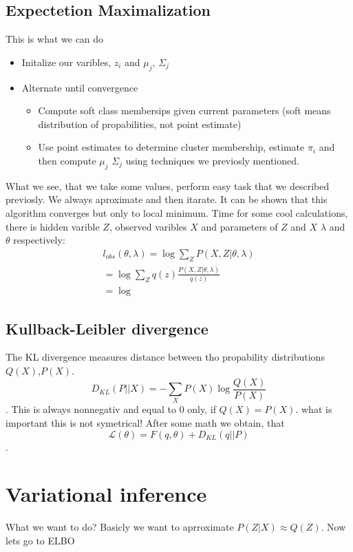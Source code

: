 \documentclass[12pt,a4paper]{article}
\begin{document}
\subsection{Expectetion Maximalization}
This is what we can do
\begin{itemize}
    \item Initalize our varibles, $z_i$ and $\mu_j$, $\Sigma_j$
    \item Alternate until convergence \begin{itemize}
        \item   Compute soft class membersips given current parameters (soft means distribution of propabilities, not point estimate)
        \item   Use point estimates to determine cluster membership, estimate $\pi_i$ and then compute $\mu_j$ $\Sigma_j$ using techniques we previosly mentioned. 
    \end{itemize}
\end{itemize}
What we see, that we take some values, perform easy task that we described previosly. We always aproximate and then itarate. It can be shown that this algorithm converges but only
to local minimum. Time for some cool calculations, there is hidden varible $Z$, observed varibles $X$ and parameters of $Z$ and $X$ $\lambda$ and $\theta$ respectively:
\begin{align}
    l_{obs}(\theta,\lambda)=\log\sum_Z P(X,Z|\theta,\lambda)\\
    =\log\sum_Z q(z) \frac{P(X,Z|\theta,\lambda)}{q(z)}\\
    =\log 
\end{align}
\subsection{Kullback-Leibler divergence}
The KL divergence measures distance between tho propability distributions $Q(X)$,$P(X)$.
\begin{equation}
    D_{KL} (P || X)=-\sum_X P(X)\log{\frac{Q(X)}{P(X)}}
\end{equation}.
This is always nonnegativ and equal to $0$ only, if $Q(X)=P(X)$. what is important this is not symetrical!
After some math we obtain, that
\begin{equation}
\mathcal{L}(\theta)=F(q,\theta)+D_{KL}(q||P)
\end{equation}.
\section{Variational inference}
What we want to do? Basicly we want to aprroximate $P(Z|X)\approx Q(Z)$. Now lets go to ELBO
\end{document}
